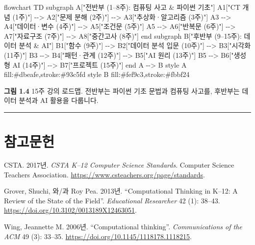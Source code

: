 \documentclass[
  korean,
  11pt,
  a4paper,
  DIV=11,
  numbers=noendperiod]{scrreprt}
\newenvironment{Shaded}{\begin{snugshade}}{\end{snugshade}}
\newcommand{\NormalTok}[1]{\textcolor[rgb]{0.00,0.23,0.31}{#1}}
\newlength{\cslhangindent}
\newenvironment{CSLReferences}[2] %
 {\begin{list}{}{%
  \setlength{\itemindent}{0pt}
  \setlength{\leftmargin}{0pt}
  \setlength{\parsep}{0pt}
  \ifodd #1
   \setlength{\leftmargin}{\cslhangindent}
   \setlength{\itemindent}{-1\cslhangindent}
  \fi
  \setlength{\itemsep}{#2\baselineskip}}}
 {\end{list}}
\begin{document}
\begin{Shaded}
\begin{Highlighting}[]
\NormalTok{flowchart TD}
\NormalTok{    subgraph A["전반부 (1–8주): 컴퓨팅 사고 \& 파이썬 기초"]}
\NormalTok{        A1["CT 개념 (1주)"] {-}{-}\textgreater{} A2["문제 분해 (2주)"] {-}{-}\textgreater{} A3["추상화·알고리즘 (3주)"]}
\NormalTok{        A3 {-}{-}\textgreater{} A4["데이터·변수 (4주)"] {-}{-}\textgreater{} A5["조건문 (5주)"]}
\NormalTok{        A5 {-}{-}\textgreater{} A6["반복문 (6주)"] {-}{-}\textgreater{} A7["자료구조 (7주)"] {-}{-}\textgreater{} A8["중간고사 (8주)"]}
\NormalTok{    end}
\NormalTok{    subgraph B["후반부 (9–15주): 데이터 분석 \& AI"]}
\NormalTok{        B1["함수 (9주)"] {-}{-}\textgreater{} B2["데이터 분석 입문 (10주)"] {-}{-}\textgreater{} B3["시각화 (11주)"]}
\NormalTok{        B3 {-}{-}\textgreater{} B4["패턴·관계 (12주)"] {-}{-}\textgreater{} B5["AI 원리 (13주)"]}
\NormalTok{        B5 {-}{-}\textgreater{} B6["생성형 AI (14주)"] {-}{-}\textgreater{} B7["프로젝트 (15주)"]}
\NormalTok{    end}
\NormalTok{    A {-}{-}\textgreater{} B}
\NormalTok{    style A fill:\#dbeafe,stroke:\#93c5fd}
\NormalTok{    style B fill:\#fef9c3,stroke:\#fbbf24}
\end{Highlighting}
\end{Shaded}

\textbf{그림 1.4} 15주 강의 로드맵. 전반부는 파이썬 기초 문법과 컴퓨팅
사고를, 후반부는 데이터 분석과 AI 활용을 다룹니다.

\begin{center}\rule{0.5\linewidth}{0.5pt}\end{center}

\section*{참고문헌}\label{uxcc38uxace0uxbb38uxd5cc}


\protect{}\label{refs}
\begin{CSLReferences}{1}{1}
CSTA. 2017년. \emph{CSTA K--12 Computer Science Standards}. Computer
Science Teachers Association.
\url{https://www.csteachers.org/page/standards}.

Grover, Shuchi, 와/과 Roy Pea. 2013년. {``Computational Thinking in
K--12: A Review of the State of the Field''}. \emph{Educational
Researcher} 42 (1): 38--43.
\url{https://doi.org/10.3102/0013189X12463051}.

Wing, Jeannette M. 2006년. {``Computational thinking''}.
\emph{Communications of the ACM} 49 (3): 33--35.
\url{https://doi.org/10.1145/1118178.1118215}.

\end{CSLReferences}
\end{document}
